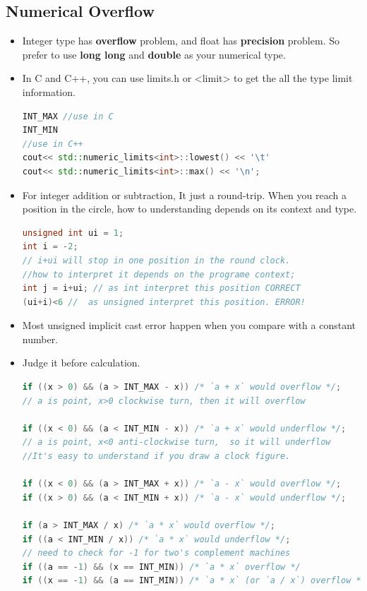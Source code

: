 \documentclass[a4paper,12pt,twoside]{book}
\begin{document}
\subsection{Numerical Overflow}

\begin{itemize}
\item Integer type has \textbf{overflow} problem, and float has \textbf{precision} problem. So prefer to use \textbf{long long} and \textbf{double} as your numerical type.

\item In C and C++, you can use limits.h or <limit> to get the all the type limit information.
\begin{lstlisting}[frame=single, language=c++]
INT_MAX //use in C
INT_MIN
//use in C++
cout<< std::numeric_limits<int>::lowest() << '\t'
cout<< std::numeric_limits<int>::max() << '\n';
\end{lstlisting}

\item For integer addition or subtraction, It just a round-trip. When you reach a position in the circle, how to understanding depends on its context and type.
\begin{lstlisting}[frame=single, language=c++]
unsigned int ui = 1;
int i = -2;
// i+ui will stop in one position in the round clock.
//how to interpret it depends on the programe context;
int j = i+ui; // as int interpret this position CORRECT
(ui+i)<6 //  as unsigned interpret this position. ERROR!
\end{lstlisting}

\item Most unsigned implicit cast error happen when you compare with a constant number. 

\item  Judge it before calculation.
\begin{lstlisting}[frame=single, language=c++]
if ((x > 0) && (a > INT_MAX - x)) /* `a + x` would overflow */;
// a is point, x>0 clockwise turn, then it will overflow

if ((x < 0) && (a < INT_MIN - x)) /* `a + x` would underflow */;
// a is point, x<0 anti-clockwise turn,  so it will underflow
//It's easy to understand if you draw a clock figure.

if ((x < 0) && (a > INT_MAX + x)) /* `a - x` would overflow */;
if ((x > 0) && (a < INT_MIN + x)) /* `a - x` would underflow */;

if (a > INT_MAX / x) /* `a * x` would overflow */;
if ((a < INT_MIN / x)) /* `a * x` would underflow */;
// need to check for -1 for two's complement machines
if ((a == -1) && (x == INT_MIN)) /* `a * x` overflow */
if ((x == -1) && (a == INT_MIN)) /* `a * x` (or `a / x`) overflow */
\end{lstlisting}


\end{itemize}
\end{document}
